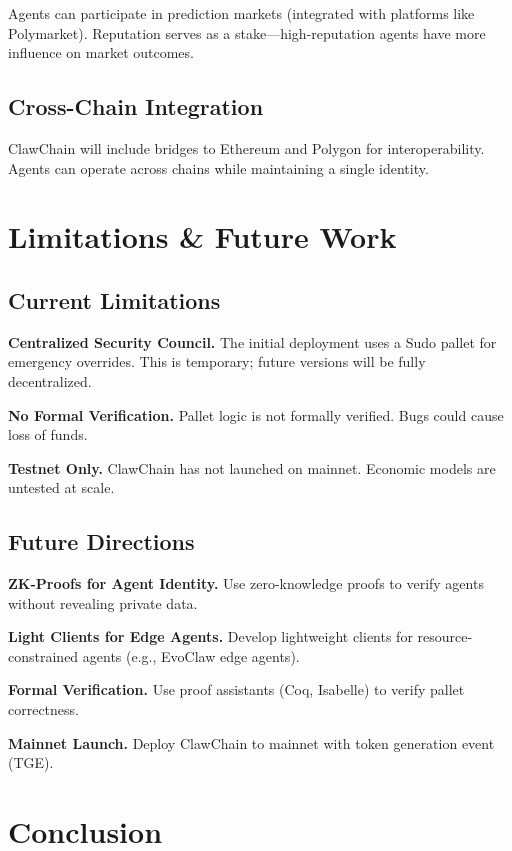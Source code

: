 \documentclass{article}
\begin{document}
Agents can participate in prediction markets (integrated with platforms like Polymarket). Reputation serves as a stake—high-reputation agents have more influence on market outcomes.

\subsection{Cross-Chain Integration}

ClawChain will include bridges to Ethereum and Polygon for interoperability. Agents can operate across chains while maintaining a single identity.

\section{Limitations \& Future Work}\label{sec:limitations}

\subsection{Current Limitations}

\textbf{Centralized Security Council.} The initial deployment uses a Sudo pallet for emergency overrides. This is temporary; future versions will be fully decentralized.

\textbf{No Formal Verification.} Pallet logic is not formally verified. Bugs could cause loss of funds.

\textbf{Testnet Only.} ClawChain has not launched on mainnet. Economic models are untested at scale.

\subsection{Future Directions}

\textbf{ZK-Proofs for Agent Identity.} Use zero-knowledge proofs to verify agents without revealing private data.

\textbf{Light Clients for Edge Agents.} Develop lightweight clients for resource-constrained agents (e.g., EvoClaw edge agents).

\textbf{Formal Verification.} Use proof assistants (Coq, Isabelle) to verify pallet correctness.

\textbf{Mainnet Launch.} Deploy ClawChain to mainnet with token generation event (TGE).

\section{Conclusion}\label{sec:conclusion}
\end{document}
